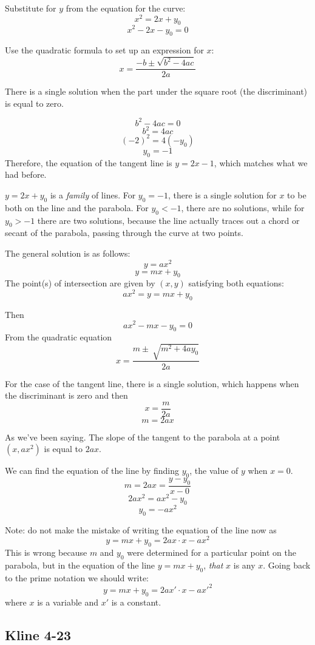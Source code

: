 \documentclass[11pt, oneside]{article}
\begin{document}
Substitute for $y$ from the equation for the curve:
\[ x^2 = 2x + y_0 \]
\[ x^2 - 2x - y_0 = 0 \]

Use the quadratic formula to set up an expression for $x$:
\[ x = \frac{-b \pm \sqrt{b^2 - 4ac}}{2a} \]

There is a single solution when the part under the square root (the discriminant) is equal to zero.

\[ b^2 - 4ac = 0 \]
\[ b^2 = 4ac \]
\[ (-2)^2 = 4(-y_0) \]
\[ y_0 = -1 \]
Therefore, the equation of the tangent line is $y = 2x - 1$, which matches what we had before.

$y = 2x + y_0$ is a \emph{family} of lines.  For $y_0 = -1$, there is a single solution for $x$ to be both on the line and the parabola.  For $y_0 < -1$, there are no solutions, while for $y_0 > -1$ there are two solutions, because the line actually traces out a chord or secant of the parabola, passing through the curve at two points.

The general solution is as follows:
\[ y = ax^2 \]
\[ y = mx + y_0 \]
The point(s) of intersection are given by $(x,y)$ satisfying both equations:
\[ ax^2 = y = mx + y_0 \]

Then
\[ ax^2 - mx - y_0 = 0 \]
From the quadratic equation
\[ x = \frac{m \pm \ \sqrt{m^2 + 4ay_0}}{2a} \]

For the case of the tangent line, there is a single solution, which happens when the discriminant is zero and then
\[ x = \frac{m}{2a} \]
\[ m = 2ax \]

As we've been saying.  The slope of the tangent to the parabola at a point $(x, ax^2)$ is equal to $2ax$.

We can find the equation of the line by finding $y_0$, the value of $y$ when $x = 0$.
\[ m = 2ax = \frac{y - y_0}{x - 0} \]
\[ 2ax^2 = ax^2 - y_0 \]
\[ y_0 = -ax^2 \]

Note:  do not make the mistake of writing the equation of the line now as
\[ y = mx + y_0 = 2ax \cdot x - ax^2 \]
This is wrong because $m$ and $y_0$ were determined for a particular point on the parabola, but in the equation of the line $y = mx + y_0$, \emph{that} $x$ is any $x$.  Going back to the prime notation we should write:
\[ y = mx + y_0 = 2ax' \cdot x - ax'^2 \]
where $x$ is a variable and $x'$ is a constant.

\subsection*{Kline 4-23}
\end{document}
